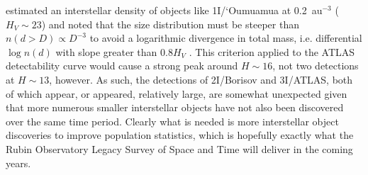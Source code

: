 \documentclass[twocolumn,longbib]{aastex7}
\begin{document}
\begin{CJK*}{UTF8}{gbsn}
\cite{Do2018} estimated an interstellar density of objects like 1I/`Oumuamua at 0.2~au$^{-3}$ ($H_V\sim23$) and noted that the size distribution must be steeper than $n(d>D)\propto D^{-3}$ to avoid a logarithmic divergence in total mass, i.e. differential $\log n(d)$ with slope greater than $0.8H_V$ \citep[see Fig. 3 of ][]{Do2018}.  This criterion applied to the ATLAS detectability curve would cause a strong peak around $H\sim16$, not two detections at $H\sim13$, however.  As such, the detections of 2I/Borisov and 3I/ATLAS, both of which appear, or appeared, relatively large, are somewhat unexpected given that more numerous smaller interstellar objects have not also been discovered over the same time period.  Clearly what is needed is more interstellar object discoveries to improve population statistics, which is hopefully exactly what the Rubin Observatory Legacy Survey of Space and Time \citep[LSST;][]{jones2009_lsst} will deliver in the coming years.




\end{CJK*}
\end{document}
